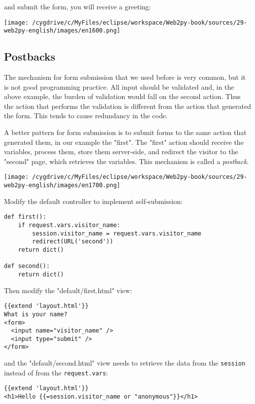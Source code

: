\documentclass[justified,sixbynine,notoc]{tufte-book}
\def\ft{\small\tt}
\def\inxx#1{\index{#1}}
\begin{document}
\begin{fullwidth}
\noindent and submit the form, you will receive a greeting:


\goodbreak\begin{center}\texttt{[image: /cygdrive/c/MyFiles/eclipse/workspace/Web2py-book/sources/29-web2py-english/images/en1600.png]}\end{center}


\goodbreak\subsection{Postbacks}

\inxx{redirect} \inxx{URL} \inxx{postback}

The mechanism for form submission that we used before is very common, but it is not good programming practice. All input should be validated and, in the above example, the burden of validation would fall on the second action. Thus the action that performs the validation is different from the action that generated the form. This tends to cause redundancy in the code.

A better pattern for form submission is to submit forms to the same action that generated them, in our example the "first". The "first" action should receive the variables, process them, store them server-side, and redirect the visitor to the "second" page, which retrieves the variables. This mechanism is called a {\it postback}.


\goodbreak\begin{center}\texttt{[image: /cygdrive/c/MyFiles/eclipse/workspace/Web2py-book/sources/29-web2py-english/images/en1700.png]}\end{center}


Modify the default controller to implement self-submission:
\begin{lstlisting}
def first():
    if request.vars.visitor_name:
        session.visitor_name = request.vars.visitor_name
        redirect(URL('second'))
    return dict()

def second():
    return dict()
\end{lstlisting}

Then modify the "default/first.html" view:
\begin{lstlisting}[keywords={}]
{{extend 'layout.html'}}
What is your name?
<form>
  <input name="visitor_name" />
  <input type="submit" />
</form>
\end{lstlisting}
\noindent and the "default/second.html" view needs to retrieve the data from the {\ft session} instead of from the {\ft request.vars}:
\begin{lstlisting}[keywords={}]
{{extend 'layout.html'}}
<h1>Hello {{=session.visitor_name or "anonymous"}}</h1>
\end{lstlisting}


\end{fullwidth}
\end{document}
